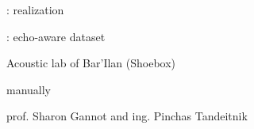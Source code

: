 \begin{frame}[t]{\dechorate: realization}

    \vspace{-2mm}
    \begin{block}{\dechorate: echo-aware dataset}
        \begin{description}
            \item<2->[Recorded:] Acoustic lab of Bar'Ilan (Shoebox)
            \item<3->[Annotated:] manually
            \item<4->[Collaboration:]  prof. Sharon Gannot and ing. Pinchas Tandeitnik
        \end{description}
    \end{block}



\end{frame}
